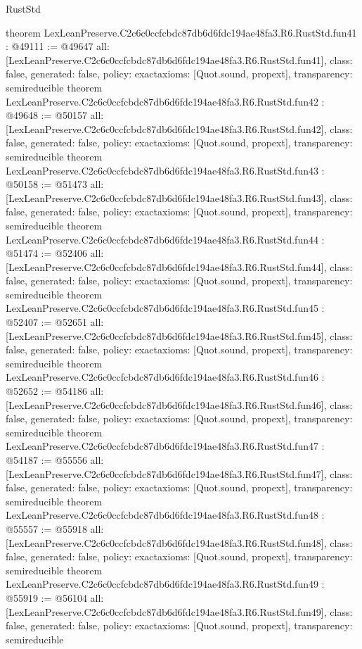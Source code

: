 \begin{lexlean}{RustStd}
\begin{coremodule}
{}
theorem LexLeanPreserve.C2c6c0ccfcbdc87db6d6fdc194ae48fa3.R6.RustStd.fun41 : @49111 := @49647 {
  all: [LexLeanPreserve.C2c6c0ccfcbdc87db6d6fdc194ae48fa3.R6.RustStd.fun41],
  class: false,
  generated: false,
  policy: exact{axioms: [Quot.sound, propext]},
  transparency: semireducible
}
theorem LexLeanPreserve.C2c6c0ccfcbdc87db6d6fdc194ae48fa3.R6.RustStd.fun42 : @49648 := @50157 {
  all: [LexLeanPreserve.C2c6c0ccfcbdc87db6d6fdc194ae48fa3.R6.RustStd.fun42],
  class: false,
  generated: false,
  policy: exact{axioms: [Quot.sound, propext]},
  transparency: semireducible
}
theorem LexLeanPreserve.C2c6c0ccfcbdc87db6d6fdc194ae48fa3.R6.RustStd.fun43 : @50158 := @51473 {
  all: [LexLeanPreserve.C2c6c0ccfcbdc87db6d6fdc194ae48fa3.R6.RustStd.fun43],
  class: false,
  generated: false,
  policy: exact{axioms: [Quot.sound, propext]},
  transparency: semireducible
}
theorem LexLeanPreserve.C2c6c0ccfcbdc87db6d6fdc194ae48fa3.R6.RustStd.fun44 : @51474 := @52406 {
  all: [LexLeanPreserve.C2c6c0ccfcbdc87db6d6fdc194ae48fa3.R6.RustStd.fun44],
  class: false,
  generated: false,
  policy: exact{axioms: [Quot.sound, propext]},
  transparency: semireducible
}
theorem LexLeanPreserve.C2c6c0ccfcbdc87db6d6fdc194ae48fa3.R6.RustStd.fun45 : @52407 := @52651 {
  all: [LexLeanPreserve.C2c6c0ccfcbdc87db6d6fdc194ae48fa3.R6.RustStd.fun45],
  class: false,
  generated: false,
  policy: exact{axioms: [Quot.sound, propext]},
  transparency: semireducible
}
theorem LexLeanPreserve.C2c6c0ccfcbdc87db6d6fdc194ae48fa3.R6.RustStd.fun46 : @52652 := @54186 {
  all: [LexLeanPreserve.C2c6c0ccfcbdc87db6d6fdc194ae48fa3.R6.RustStd.fun46],
  class: false,
  generated: false,
  policy: exact{axioms: [Quot.sound, propext]},
  transparency: semireducible
}
theorem LexLeanPreserve.C2c6c0ccfcbdc87db6d6fdc194ae48fa3.R6.RustStd.fun47 : @54187 := @55556 {
  all: [LexLeanPreserve.C2c6c0ccfcbdc87db6d6fdc194ae48fa3.R6.RustStd.fun47],
  class: false,
  generated: false,
  policy: exact{axioms: [Quot.sound, propext]},
  transparency: semireducible
}
theorem LexLeanPreserve.C2c6c0ccfcbdc87db6d6fdc194ae48fa3.R6.RustStd.fun48 : @55557 := @55918 {
  all: [LexLeanPreserve.C2c6c0ccfcbdc87db6d6fdc194ae48fa3.R6.RustStd.fun48],
  class: false,
  generated: false,
  policy: exact{axioms: [Quot.sound, propext]},
  transparency: semireducible
}
theorem LexLeanPreserve.C2c6c0ccfcbdc87db6d6fdc194ae48fa3.R6.RustStd.fun49 : @55919 := @56104 {
  all: [LexLeanPreserve.C2c6c0ccfcbdc87db6d6fdc194ae48fa3.R6.RustStd.fun49],
  class: false,
  generated: false,
  policy: exact{axioms: [Quot.sound, propext]},
  transparency: semireducible
}
\end{coremodule}
\end{lexlean}
